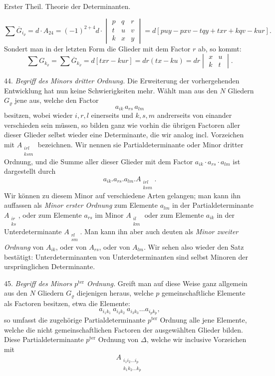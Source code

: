 Erster Theil. Theorie der Determinanten.

\[
\sum \overline{G}_{i_\varrho} = d \cdot A_{24} = (-1)^{2+4} d \cdot \begin{vmatrix} p & q & r\\ t & u & v\\ k & x & y \end{vmatrix}
= d[puy - pxv - tqy + txr + kqv - kur].
\]
Sondert man in der letzten Form die Glieder mit dem Factor $r$ ab, so kommt:
\[
\sum G_{k_\varrho} = \sum \overline{G}_{k_\varrho} = d[txr - kur] = dr(tx - ku) = dr \begin{vmatrix} x & u\\ k & t \end{vmatrix}.
\]

44. \textit{Begriff des Minors dritter Ordnung.} Die Erweiterung der vorhergehenden Entwicklung hat nun keine Schwierigkeiten mehr. Wählt man aus den $N$ Gliedern $G_\varrho$ jene aus, welche den Factor
\[
a_{ik}\, a_{rs}\, a_{lm}
\]
besitzen, wobei wieder $i, r, l$ einerseits und $k, s, m$ andrerseits von einander verschieden sein müssen, so bilden ganz wie vorhin die übrigen Factoren aller dieser Glieder selbst wieder eine Determinante, die wir analog incl. Vorzeichen mit $A_{\substack{irl\\ksm}}$ bezeichnen. Wir nennen sie Partialdeterminante oder Minor dritter Ordnung, und die Summe aller dieser Glieder mit dem Factor $a_{ik} \cdot a_{rs} \cdot a_{lm}$ ist dargestellt durch
\[
a_{ik} . a_{rs} . a_{lm} . A_{\substack{irl\\ksm}}.
\]
Wir können zu diesem Minor auf verschiedene Arten gelangen; man kann ihn auffassen als \textit{Minor erster Ordnung} zum Elemente $a_{lm}$ in der Partialdeterminante $A_{\substack{ir\\ks}}$, oder zum Elemente $a_{rs}$ im Minor $A_{\substack{il\\km}}$ oder zum Elemente $a_{ik}$ in der Unterdeterminante $A_{\substack{rl\\sm}}$. Man kann ihn aber auch deuten als \textit{Minor zweiter Ordnung} von $A_{ik}$, oder von $A_{rs}$, oder von $A_{lm}$. Wir sehen also wieder den Satz bestätigt: Unterdeterminanten von Unterdeterminanten sind selbst Minoren der ursprünglichen Determinante.

45. \textit{Begriff des Minors $p^{\text{ter}}$ Ordnung.} Greift man auf diese Weise ganz allgemein aus den $N$ Gliedern $G_\varrho$ diejenigen heraus, welche $p$ gemeinschaftliche Elemente als Factoren besitzen, etwa die Elemente:
\[
a_{i_1k_1}\ a_{i_2k_2}\ a_{i_3k_3} \ldots a_{i_pk_p},
\]
so umfasst die zugehörige Partialdeterminante $p^{\text{ter}}$ Ordnung alle jene Elemente, welche die nicht gemeinschaftlichen Factoren der ausgewählten Glieder bilden. Diese Partialdeterminante $p^{\text{ter}}$ Ordnung von $\varDelta$, welche wir inclusive Vorzeichen mit
\[
A_{\substack{i_1 i_2 \ldots i_p\\ k_1 k_2 \ldots k_p}}
\]


